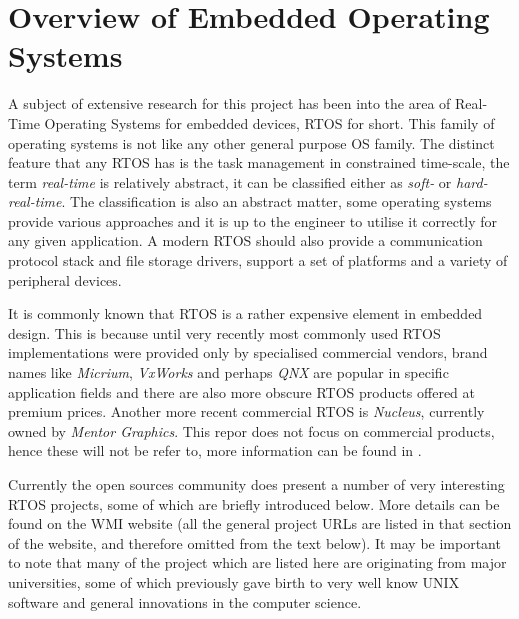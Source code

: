 \section{Overview of Embedded Operating Systems} \label{sec:RTOS}


   A subject of extensive research for this project has been into the
  area of Real-Time Operating Systems for embedded devices, RTOS for short.
  This family of operating systems is not like any other general
  purpose OS family. The distinct feature that any RTOS has is the task
  management in constrained time-scale, the term \emph{real-time} is relatively
  abstract, it can be classified either as \emph{soft-} or \emph{hard-real-time}.
  The classification is also an abstract matter, some operating systems provide
  various approaches and it is up to the engineer to utilise it correctly for
  any given application. A modern RTOS should also provide a communication
  protocol stack and file storage drivers, support a set of platforms and
  a variety of peripheral devices.
 
 It is commonly known that RTOS is a rather expensive element in embedded design.
 This is because until very recently most commonly used RTOS implementations were
 provided only by specialised commercial vendors, brand names like \emph{Micrium},
 \emph{VxWorks} and perhaps \emph{QNX} are popular in specific application fields
 and there are also more obscure RTOS products offered at premium prices. Another
 more recent commercial RTOS is \emph{Nucleus}, currently owned by \emph{Mentor
 Graphics}. This repor does not focus on commercial products, hence these will
 not be refer to, more information can be found in \cite{wiki:rtos,wiki:rtos:list}.


 Currently the open sources community does present a number of very interesting
 RTOS projects, some of which are briefly introduced below. More details can be
 found on the WMI website \cite{wmi:wiki:rtos} (all the general project URLs are
 listed in that section of the website, and therefore omitted from the text below).
 It may be important to note that many of the project which are listed here are
 originating from major universities, some of which previously gave birth to very
 well know UNIX software and general innovations in the computer science.


